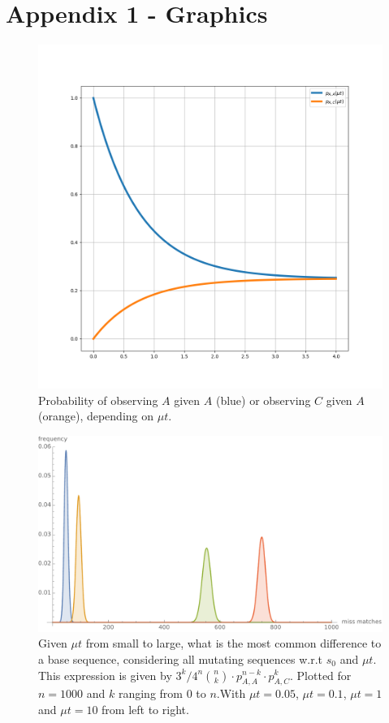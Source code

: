 \documentclass[12pt]{article}
\begin{document}
\newpage 

\section{Appendix 1 - Graphics}
\begin{figure}[h!]
	\centering
	\includegraphics[width=1.0\linewidth]{mutationAAAC}
	\caption{Probability of observing $A$ given $A$ (blue) or observing $C$ given $A$ (orange), depending on $\mu t$.}
	\label{fig:mutationaaac}
\end{figure}
	
\begin{figure}
	\centering
	\includegraphics[width=1.0\linewidth]{difference}
	\caption{Given $\mu t$ from small to large, what is the most common difference to a base sequence, considering all mutating sequences w.r.t $s_0$ and $\mu t$. This expression is given by $3^k/4^n \binom{n}{k}\cdot p_{A,A}^{n-k}\cdot p_{A,C}^k$. Plotted for $n=1000$ and $k$ ranging from $0$ to $n$.With $\mu t = 0.05$, $\mu t = 0.1$, $\mu t = 1$ and $\mu t=10$ from left to right.}
	\label{fig:difference}
\end{figure}
\end{document}
